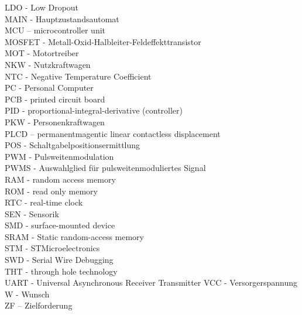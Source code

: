 LDO - Low Dropout\\
MAIN - Hauptzustandsautomat\\
MCU – microcontroller unit\\
MOSFET - Metall-Oxid-Halbleiter-Feldeffekttransistor\\
MOT - Motortreiber\\
NKW - Nutzkraftwagen\\
NTC - Negative Temperature Coefficient\\
PC - Personal Computer\\
PCB - printed circuit board\\
PID - proportional-integral-derivative (controller)\\
PKW - Personenkraftwagen\\
PLCD – permanentmagentic linear contactless displacement\\
POS - Schaltgabelpositionsermittlung\\
PWM - Pulsweitenmodulation\\ 
PWMS - Auswahlglied für pulsweitenmoduliertes Signal\\
RAM - random access memory\\
ROM - read only memory\\
RTC - real-time clock\\
SEN - Sensorik\\
SMD - surface-mounted device\\
SRAM - Static random-access memory\\
STM - STMicroelectronics\\
SWD - Serial Wire Debugging\\
THT - through hole technology\\
UART - Universal Asynchronous Receiver Transmitter
VCC - Versorgerspannung
W - Wunsch\\
ZF – Zielforderung\\
